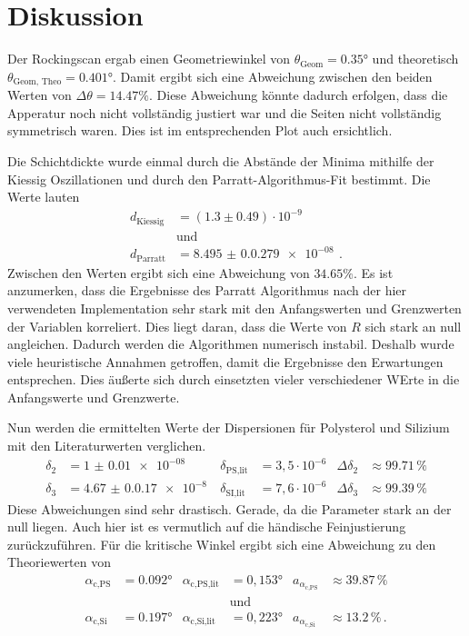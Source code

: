 \section{Diskussion}
\label{sec:Diskussion}

Der Rockingscan ergab einen Geometriewinkel von $\theta_\text{Geom} = 0.35 \unit\degree$ und theoretisch
$\theta_\text{Geom, Theo} = 0.401 \unit\degree$.
Damit ergibt sich eine Abweichung zwischen den beiden Werten von $\Delta \theta = 14.47 \%$.
Diese Abweichung könnte dadurch erfolgen, dass die Apperatur noch nicht vollständig justiert war und die Seiten nicht vollständig symmetrisch waren.
Dies ist im entsprechenden Plot auch ersichtlich.

Die Schichtdickte wurde einmal durch die Abstände der Minima mithilfe der Kiessig Oszillationen und durch den Parratt-Algorithmus-Fit bestimmt.
Die Werte lauten
\begin{align*}
    d_\text{Kiessig} &= (1.3 \pm 0.49) \cdot 10^{-9} \\
    & \text{und} \\
    d_\text{Parratt} & = \qty{8.495(0.0279)e-08}{} \, .
\end{align*}
Zwischen den Werten ergibt sich eine Abweichung von $34.65 \%$.
Es ist anzumerken, dass die Ergebnisse des Parratt Algorithmus nach der hier verwendeten Implementation sehr stark mit den Anfangswerten und Grenzwerten der Variablen korreliert.
Dies liegt daran, dass die Werte von $R$ sich stark an null angleichen.
Dadurch werden die Algorithmen numerisch instabil.
Deshalb wurde viele heuristische Annahmen getroffen, damit die Ergebnisse den Erwartungen entsprechen.
Dies äußerte sich durch einsetzten vieler verschiedener WErte in die Anfangswerte und Grenzwerte.

Nun werden die ermittelten Werte der Dispersionen für Polysterol und Silizium mit den Literaturwerten \cite{v44} verglichen.
\begin{align*}
    \delta_2 &= \qty{1(0.01)e-08}{} & \delta_{\text{PS,lit}} &= 3,5 \cdot 10^{-6} & \Delta {\delta_2} &\approx 99.71\, \% \\
    \delta_3 &= \qty{4.67(0.017)e-8}{} & \delta_{\text{SI,lit}} &= 7,6 \cdot 10^{-6} & \Delta {\delta_3} &\approx 99.39\, \%
\end{align*}
Diese Abweichungen sind sehr drastisch. Gerade, da die Parameter stark an der null liegen.
Auch hier ist es vermutlich auf die händische Feinjustierung zurückzuführen.
Für die kritische Winkel ergibt sich eine Abweichung zu den Theoriewerten \cite{tolan_xray} von
\begin{align*}
    \alpha_{\text{c,PS}} &= 0.092° & \alpha_{\text{c,PS,lit}} &= 0,153° & a_{\alpha_{\text{c,PS}}} &\approx 39.87 \, \%  \\
    &&&\text{und}&& \\
    \alpha_{\text{c,Si}} &= 0.197° & \alpha_{\text{c,Si,lit}} &= 0,223° & a_{\alpha_{\text{c,Si}}} &\approx 13.2 \, \% \, .
\end{align*}
